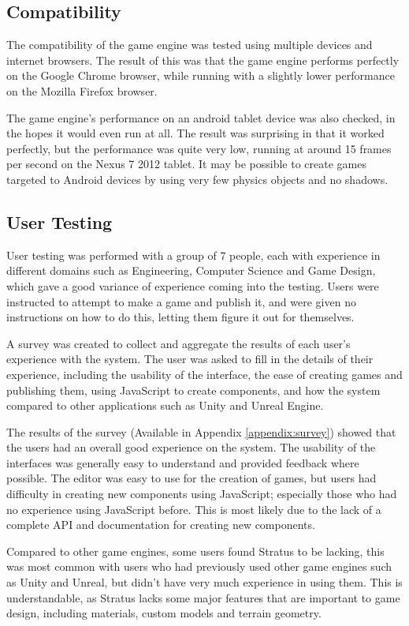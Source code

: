	\subsection{Compatibility}
	The compatibility of the game engine was tested using multiple devices and internet browsers. The result of this was that the game engine performs perfectly on the Google Chrome browser, while running with a slightly lower performance on the Mozilla Firefox browser.

	The game engine's performance on an android tablet device was also checked, in the hopes it would even run at all. The result was surprising in that it worked perfectly, but the performance was quite very low, running at around 15 frames per second on the Nexus 7 2012 tablet. It may be possible to create games targeted to Android devices by using very few physics objects and no shadows.

	\subsection{User Testing}
	User testing was performed with a group of 7 people, each with experience in different domains such as Engineering, Computer Science and Game Design, which gave a good variance of experience coming into the testing. Users were instructed to attempt to make a game and publish it, and were given no instructions on how to do this, letting them figure it out for themselves.

	A survey was created to collect and aggregate the results of each user's experience with the system. The user was asked to fill in the details of their experience, including the usability of the interface, the ease of creating games and publishing them, using JavaScript to create components, and how the system compared to other applications such as Unity and Unreal Engine.

	The results of the survey (Available in Appendix \ref{appendix:survey}) showed that the users had an overall good experience on the system. The usability of the interfaces was generally easy to understand and provided feedback where possible. The editor was easy to use for the creation of games, but users had difficulty in creating new components using JavaScript; especially those who had no experience using JavaScript before. This is most likely due to the lack of a complete API and documentation for creating new components.

	Compared to other game engines, some users found Stratus to be lacking, this was most common with users who had previously used other game engines such as Unity and Unreal, but didn't have very much experience in using them. This is understandable, as Stratus lacks some major features that are important to game design, including materials, custom models and terrain geometry.

